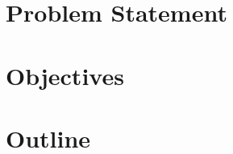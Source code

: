 \lipsum

\section{Problem Statement}
\label{sec:problem-statement}

\lipsum

\section{Objectives}
\label{sec:objectives}

\lipsum

\section{Outline}
\label{sec:outline}

\lipsum